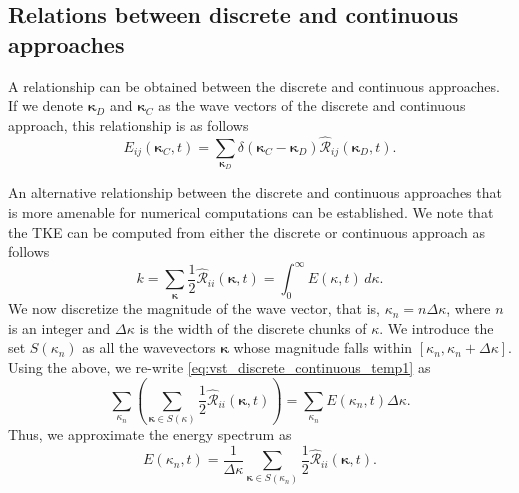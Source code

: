 \documentclass[oneside,a4paper,11pt]{report}
\newcommand{\tpvc}{\mathcal{R}} %
\newcommand{\est}{E}            %
\newcommand{\kappavec}{\boldsymbol{\kappa}}
\begin{document}
\subsection{Relations between discrete and continuous approaches}

A relationship can be obtained between the discrete and continuous approaches. If we denote $\kappavec_D$ and $\kappavec_C$ as the wave vectors of the discrete and continuous approach, this relationship is as follows
\begin{equation}
\label{eq:vst_discrete_continuous}
\est_{ij}(\kappavec_C,t) = \sum_{\kappavec_D} \delta(\kappavec_C - \kappavec_D) \hat{\tpvc}_{ij}(\kappavec_D,t).
\end{equation}

An alternative relationship between the discrete and continuous approaches that is more amenable for numerical computations can be established. We note that the TKE can be computed from either the discrete or continuous approach as follows
\begin{equation}
    \label{eq:vst_discrete_continuous_temp1}
    k = \sum_{\kappavec} \frac{1}{2} \hat{\tpvc}_{ii}(\kappavec,t) = \int_0^\infty \est(\kappa,t) \, d \kappa.
\end{equation}
We now discretize the magnitude of the wave vector, that is, $\kappa_n = n \Delta \kappa$, where $n$ is an integer and $\Delta \kappa$ is the width of the discrete chunks of $\kappa$. We introduce the set $S(\kappa_n)$ as all the wavevectors $\kappavec$ whose magnitude falls within $[\kappa_n, \kappa_n + \Delta \kappa]$. Using the above, we re-write \cref{eq:vst_discrete_continuous_temp1} as
\begin{equation}
    \sum_{\kappa_n} \left ( \sum_{\kappavec \in S(\kappa)} \frac{1}{2} \hat{\tpvc}_{ii}(\kappavec,t) \right) = \sum_{\kappa_n} \est(\kappa_n,t) \Delta \kappa.
\end{equation}
Thus, we approximate the energy spectrum as
\begin{equation}
    \label{eq:num_comp_spectra}
    E(\kappa_n,t) = \frac{1}{\Delta \kappa} \sum_{\kappavec \in S(\kappa_n)} \frac{1}{2} \hat{\tpvc}_{ii}(\kappavec,t) .
\end{equation}

\end{document}
